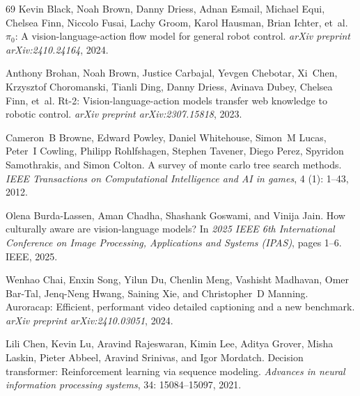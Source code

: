 \begin{thebibliography}{69}
Kevin Black, Noah Brown, Danny Driess, Adnan Esmail, Michael Equi, Chelsea Finn, Niccolo Fusai, Lachy Groom, Karol Hausman, Brian Ichter, et~al.
\newblock $\pi_0$: A vision-language-action flow model for general robot control.
\newblock \emph{arXiv preprint arXiv:2410.24164}, 2024.

Anthony Brohan, Noah Brown, Justice Carbajal, Yevgen Chebotar, Xi~Chen, Krzysztof Choromanski, Tianli Ding, Danny Driess, Avinava Dubey, Chelsea Finn, et~al.
\newblock Rt-2: Vision-language-action models transfer web knowledge to robotic control.
\newblock \emph{arXiv preprint arXiv:2307.15818}, 2023.

Cameron~B Browne, Edward Powley, Daniel Whitehouse, Simon~M Lucas, Peter~I Cowling, Philipp Rohlfshagen, Stephen Tavener, Diego Perez, Spyridon Samothrakis, and Simon Colton.
\newblock A survey of monte carlo tree search methods.
\newblock \emph{IEEE Transactions on Computational Intelligence and AI in games}, 4 (1): 1--43, 2012.

Olena Burda-Lassen, Aman Chadha, Shashank Goswami, and Vinija Jain.
\newblock How culturally aware are vision-language models?
\newblock In \emph{2025 IEEE 6th International Conference on Image Processing, Applications and Systems (IPAS)}, pages 1--6. IEEE, 2025.

Wenhao Chai, Enxin Song, Yilun Du, Chenlin Meng, Vashisht Madhavan, Omer Bar-Tal, Jenq-Neng Hwang, Saining Xie, and Christopher~D Manning.
\newblock Auroracap: Efficient, performant video detailed captioning and a new benchmark.
\newblock \emph{arXiv preprint arXiv:2410.03051}, 2024.

Lili Chen, Kevin Lu, Aravind Rajeswaran, Kimin Lee, Aditya Grover, Misha Laskin, Pieter Abbeel, Aravind Srinivas, and Igor Mordatch.
\newblock Decision transformer: Reinforcement learning via sequence modeling.
\newblock \emph{Advances in neural information processing systems}, 34: 15084--15097, 2021.


\end{thebibliography}
